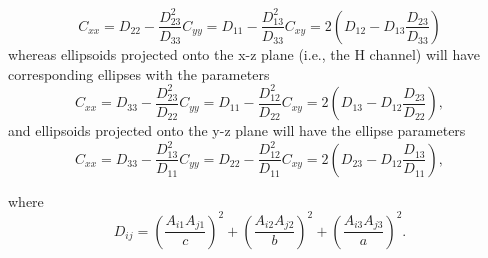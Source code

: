 \documentclass[amt, manuscript]{copernicus}
\begin{document}
\begin{subequations}\label{ellip_eq_vert}
    \begin{equation}
        C_{xx} = D_{22} - \frac{D_{23}^{2}}{D_{33}}
    \end{equation}
    \begin{equation}
        C_{yy} = D_{11} - \frac{D_{13}^{2}}{D_{33}}
    \end{equation}
    \begin{equation}
        C_{xy} = 2 \left( D_{12} - D_{13} \frac{D_{23}}{D_{33}}\right)
    \end{equation}
\end{subequations}
whereas ellipsoids projected onto the x-z plane (i.e., the H channel) will have corresponding ellipses with the parameters
\begin{subequations}\label{ellip_eq_horz}
    \begin{equation}
        C_{xx} = D_{33} - \frac{D_{23}^{2}}{D_{22}}
    \end{equation}
    \begin{equation}
        C_{yy} = D_{11} - \frac{D_{12}^{2}}{D_{22}}
    \end{equation}
    \begin{equation}
        C_{xy} = 2 \left( D_{13} - D_{12} \frac{D_{23}}{D_{22}}\right),
    \end{equation}
\end{subequations}
and ellipsoids projected onto the y-z plane will have the ellipse parameters
\begin{subequations}\label{ellip_eq_yz}
    \begin{equation}
        C_{xx} = D_{33} - \frac{D_{13}^{2}}{D_{11}}
    \end{equation}
    \begin{equation}
        C_{yy} = D_{22} - \frac{D_{12}^{2}}{D_{11}}
    \end{equation}
    \begin{equation}
        C_{xy} = 2 \left( D_{23} - D_{12} \frac{D_{13}}{D_{11}}\right),
    \end{equation}
\end{subequations}

where 
\begin{equation}
    D_{ij} = \left(\frac{A_{i1} A_{j1}}{c}\right)^{2} +  \left(\frac{A_{i2} A_{j2}}{b}\right)^{2} +  \left(\frac{A_{i3} A_{j3}}{a}\right)^{2}.
\end{equation}
\end{document}
